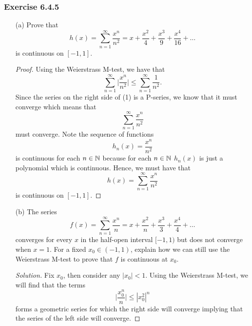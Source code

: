 \subsubsection{Exercise 6.4.5} 
\begin{enumerate}
    \item[(a)] Prove that 
        \[  h(x) = \sum_{ n=1 }^{ \infty  } \frac{ x^n  }{ n^2  } = x + \frac{ x^2  }{ 4  } + \frac{ x^3  }{ 9  } + \frac{ x^4  }{ 16 } + \dots\]
        is continuous on \( [-1,1] \).
        \begin{proof}
        Using the Weierstrass M-test, we have that
        \[  \sum_{ n=1 }^{ \infty  } \Big| \frac{ x^n  }{ n^2  }  \Big|   \leq \sum_{ n=1 }^{ \infty  } \frac{ 1 }{ n^2  } \tag{1}.\]
        Since the series on the right side of (1) is a P-series, we know that it must converge which means that 
        \[  \sum_{ n=1 }^{ \infty  } \frac{ x^n  }{ n^2  }   \] must converge. Note the sequence of functions
        \[  h_n(x) = \frac{ x^n  }{ n^2  }  \] is continuous for each \( n \in \mathbb{N}  \) because for each \( n \in \mathbb{N}  \) \( h_n(x)  \) is just a polynomial which is continuous. Hence, we must have that 
        \[  h(x) = \sum_{ n=1  }^{ \infty  } \frac{ x^n  }{ n^2  }  \]
        is continuous on \( [-1,1] \).
        \end{proof}
    \item[(b)] The series 
        \[  f(x) = \sum_{ n=1 }^{ \infty  } \frac{ x^n  }{  n  }  = x + \frac{ x^2  }{ n  }  + \frac{ x^3  }{ 3  }  + \frac{ x^4  }{  4  }  + \dots \]
        converges for every \( x  \) in the half-open interval \( [-1,1) \) but does not converge when \( x = 1  \). For a fixed \( x_0 \in (-1,1)  \), explain how we can still use the Weierstrass M-test to prove that \( f  \) is continuous at \( x_0  \).
        \begin{proof}[Solution]
            Fix \( x_0  \), then consider any \( | x_0  |  < 1  \). Using the Weierstrass M-test, we will find that the terms 
            \[  \Big| \frac{ x_0^n  }{ n }  \Big|   \leq | x_0^2 |^n    \]
            forms a geometric series for which the right side will converge implying that the series of the left side will converge.
        \end{proof}
\end{enumerate}


